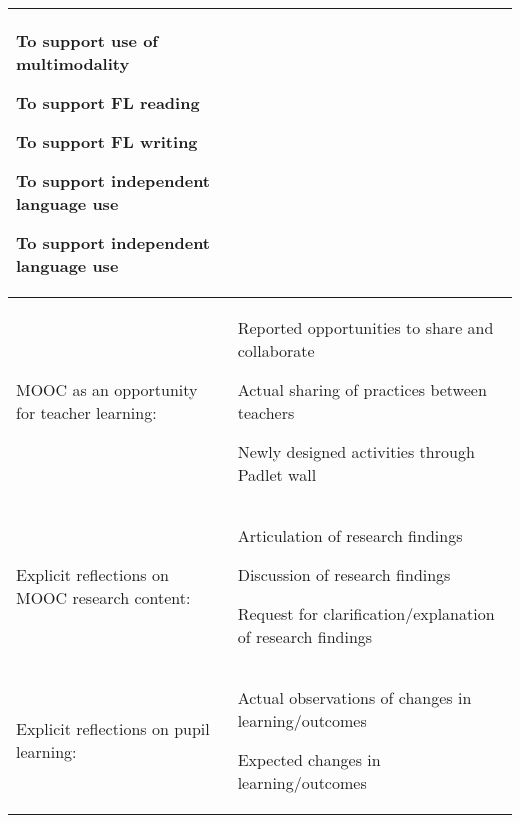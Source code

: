 \documentclass[output=paper]{langscibook}
\begin{document}
{\begin{longtable}{p{} p{}}
To support use of multimodality

To support FL reading

To support FL writing

To support independent language use

To support independent language use\\
\midrule

MOOC as an opportunity for teacher learning: & Reported opportunities to share and collaborate

Actual sharing of practices between teachers

Newly designed activities through Padlet wall\\
\midrule
Explicit reflections on MOOC research content: & Articulation of research findings

Discussion of research findings

Request for clarification\slash explanation of research findings\\
\midrule
Explicit reflections on pupil learning: & Actual observations of changes in learning\slash outcomes

Expected changes in learning\slash outcomes\\
\end{longtable}}

\printbibliography[heading=subbibliography,notkeyword=this]
\end{document}
